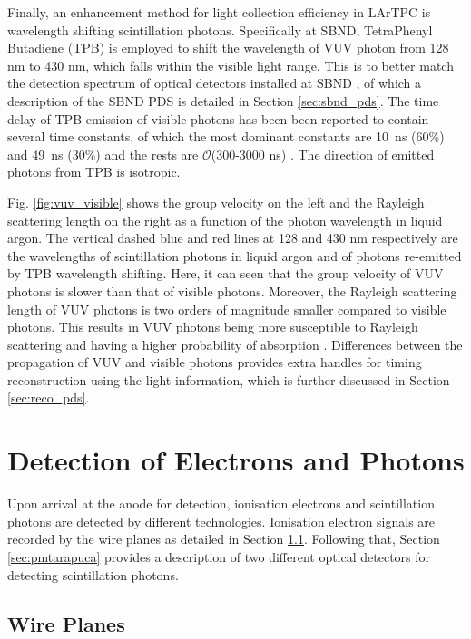Finally, an enhancement method for light collection efficiency in LArTPC is wavelength shifting scintillation photons.
Specifically at SBND, TetraPhenyl Butadiene (TPB) is employed to shift the wavelength of VUV photon from 128 nm to 430 nm, which falls within the visible light range.
This is to better match the detection spectrum of optical detectors installed at SBND \cite{sbnd_pds_paper}, of which a description of the SBND PDS is detailed in Section \ref{sec:sbnd_pds}.
The time delay of TPB emission of visible photons has been been reported to contain several time constants, of which the most dominant constants are 10~ns (60\%) and 49~ns (30\%) and the rests are $\mathcal{O}$(300-3000 ns) \cite{TPBresponse}.
The direction of emitted photons from TPB is isotropic.

Fig. \ref{fig:vuv_visible} shows the group velocity on the left and the Rayleigh scattering length on the right as a function of the photon wavelength in liquid argon.
The vertical dashed blue and red lines at 128 and 430 nm respectively are the wavelengths of scintillation photons in liquid argon and of photons re-emitted by TPB wavelength shifting. 
Here, it can seen that the group velocity of VUV photons is slower than that of visible photons.
Moreover, the Rayleigh scattering length of VUV photons is two orders of magnitude smaller compared to visible photons.
This results in VUV photons being more susceptible to Rayleigh scattering and having a higher probability of absorption \cite{PatrickPhD}.
Differences between the propagation of VUV and visible photons provides extra handles for timing reconstruction using the light information, which is further discussed in Section \ref{sec:reco_pds}.

\section{Detection of Electrons and Photons}

\label{sec3:detection}

Upon arrival at the anode for detection, ionisation electrons and scintillation photons are detected by different technologies.
Ionisation electron signals are recorded by the wire planes as detailed in Section \ref{sec:wire}.
Following that, Section \ref{sec:pmtarapuca} provides a description of two different optical detectors for detecting scintillation photons.

\subsection{Wire Planes}
\label{sec:wire}

